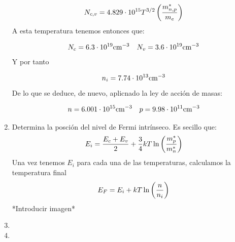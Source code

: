 \begin{texercise}
\begin{enumerate}[label=\alph*)]
		      \begin{equation}
			      N_{c,v} = 4.829\cdot 10^{15} T^{3/2} \left( \frac{m_{n,p}^*}{m_e} \right)
		      \end{equation}
		      A esta temperatura tenemos entonces que:

		      \begin{equation}
			      N_c = 6.3 \cdot 10^{19} \text{cm}^{-3} \quad N_v = 3.6 \cdot 10^{19} \text{cm}^{-3}
		      \end{equation}
		      Y por tanto

		      \begin{equation}
			      n_i = 7.74 \cdot 10^{13} \text{cm}^{-3}
		      \end{equation}
		      De lo que se deduce, de nuevo, aplicnado la ley de acción de masas:

		      \begin{equation}
			      n=6.001 \cdot 10^{15} \text{cm}^{-3} \quad p = 9.98 \cdot 10^{11} \text{cm}^{-3}
		      \end{equation}
		\item Determina la posción del nivel de Fermi intrínseco. Es secillo que:
		      \begin{equation}
			      E_i = \frac{E_c + E_v}{2} + \frac{3}{4} kT \ln \left( \frac{m_p^*}{m_n^*} \right)
		      \end{equation}
		      Una vez tenemos $E_i$ para cada una de las temperaturas, calculamos la temperatura final
		      \begin{equation}
			      E_F = E_i + kT \ln \left( \frac{n}{n_i} \right)
		      \end{equation}
		      *Introducir imagen*
		\item
		\item
	\end{enumerate}



\end{texercise}


